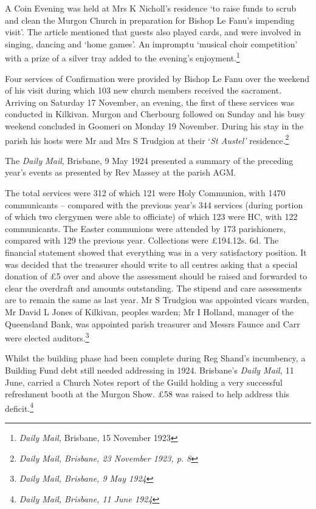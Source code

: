 A Coin Evening was held at Mrs K Nicholl's residence `to raise funds to scrub and clean the Murgon Church in preparation for Bishop Le Fanu's impending visit'. The article mentioned that guests also played cards, and were involved in singing, dancing and `home games'. An impromptu `musical choir competition' with a prize of a silver tray added to the evening's enjoyment.\footnote{\emph{Daily Mail,} Brisbane, 15 November 1923}

Four services of Confirmation were provided by Bishop Le Fanu over the weekend of his visit during which 103 new church members received the sacrament. Arriving on Saturday 17 November, an evening, the first of these services was conducted in Kilkivan. Murgon and Cherbourg followed on Sunday and his busy weekend concluded in Goomeri on Monday 19 November. During his stay in the parish his hosts were Mr and Mrs S Trudgion at their `\emph{St Austel'} residence.\footnote{\emph{Daily Mail, Brisbane, 23 November 1923, p. 8}}

The \emph{Daily Mail}, Brisbane, 9 May 1924 presented a summary of the preceding year's events as presented by Rev Massey at the parish AGM.

The total services were 312 of which 121 were Holy Communion, with 1470 communicants -- compared with the previous year's 344 services (during portion of which two clergymen were able to officiate) of which 123 were HC, with 122 communicants. The Easter communions were attended by 173 parishioners, compared with 129 the previous year. Collections were £194.12s. 6d. The financial statement showed that everything was in a very satisfactory position. It was decided that the treasurer should write to all centres asking that a special donation of £5 over and above the assessment should be raised and forwarded to clear the overdraft and amounts outstanding. The stipend and care assessments are to remain the same as last year. Mr S Trudgion was appointed vicars warden, Mr David L Jones of Kilkivan, peoples warden; Mr I Holland, manager of the Queensland Bank, was appointed parish treasurer and Messrs Faunce and Carr were elected auditors.\footnote{\emph{Daily Mail, Brisbane, 9 May 1924}}

Whilst the building phase had been complete during Reg Shand's incumbency, a Building Fund debt still needed addressing in 1924. Brisbane's \emph{Daily Mail,} 11 June, carried a Church Notes report of the Guild holding a very successful refreshment booth at the Murgon Show. £58 was raised to help address this deficit.\footnote{\emph{Daily Mail, Brisbane, 11 June 1924}}

